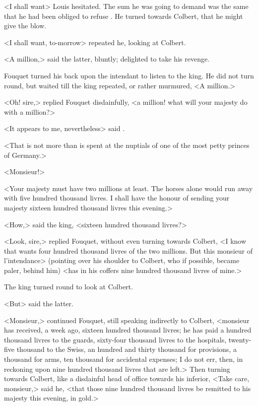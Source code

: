 <I shall want\longdash> Louis hesitated. The sum he was going to demand was the same that he had been obliged to refuse . He turned towards Colbert, that he might give the blow.

<I shall want, to-morrow\longdash> repeated he, looking at Colbert.

<A million,> said the latter, bluntly; delighted to take his revenge.

Fouquet turned his back upon the intendant to listen to the king. He did not turn round, but waited till the king repeated, or rather murmured, <A million.>

<Oh! sire,> replied Fouquet disdainfully, <a million! what will your majesty do with a million?>

<It appears to me, nevertheless\longdash> said .

<That is not more than is spent at the nuptials of one of the most petty princes of Germany.>

<Monsieur!>

<Your majesty must have two millions at least. The horses alone would run away with five hundred thousand livres. I shall have the honour of sending your majesty sixteen hundred thousand livres this evening.>

<How,> said the king, <sixteen hundred thousand livres?>

<Look, sire,> replied Fouquet, without even turning towards Colbert, <I know that wants four hundred thousand livres of the two millions. But this monsieur of l'intendance> (pointing over his shoulder to Colbert, who if possible, became paler, behind him) <has in his coffers nine hundred thousand livres of mine.>

The king turned round to look at Colbert.

<But\longdash> said the latter.

<Monsieur,> continued Fouquet, still speaking indirectly to Colbert, <monsieur has received, a week ago, sixteen hundred thousand livres; he has paid a hundred thousand livres to the guards, sixty-four thousand livres to the hospitals, twenty-five thousand to the Swiss, an hundred and thirty thousand for provisions, a thousand for arms, ten thousand for accidental expenses; I do not err, then, in reckoning upon nine hundred thousand livres that are left.> Then turning towards Colbert, like a disdainful head of office towards his inferior, <Take care, monsieur,> said he, <that those nine hundred thousand livres be remitted to his majesty this evening, in gold.>

